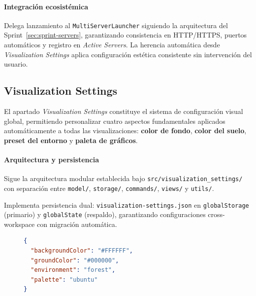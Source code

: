\documentclass[a4paper, 12pt]{book}
\begin{document}
\paragraph{Integración ecosistémica}
Delega lanzamiento al \texttt{MultiServerLauncher} siguiendo la arquitectura del Sprint~\ref{sec:sprint-servers}, garantizando consistencia en HTTP/HTTPS, puertos automáticos y registro en \emph{Active Servers}. La herencia automática desde \emph{Visualization Settings} aplica configuración estética consistente sin intervención del usuario.



\subsection{Visualization Settings}
\label{sec:visualization-settings}

El apartado \emph{Visualization Settings} constituye el sistema de configuración visual global, permitiendo personalizar cuatro aspectos fundamentales aplicados automáticamente a todas las visualizaciones: \textbf{color de fondo}, \textbf{color del suelo}, \textbf{preset del entorno} y \textbf{paleta de gráficos}.

\paragraph{Arquitectura y persistencia}
Sigue la arquitectura modular establecida bajo \texttt{src/visualization\_settings/} con separación entre \texttt{model/}, \texttt{storage/}, \texttt{commands/}, \texttt{views/} y \texttt{utils/}. 

Implementa persistencia dual: \texttt{visualization-settings.json} en \texttt{globalStorage} (primario) y \texttt{globalState} (respaldo), garantizando configuraciones cross-workspace con migración automática.

\begin{figure}[H]
\centering
\begin{minipage}{0.9\linewidth}
\begin{lstlisting}[language=json,
caption={Estructura del archivo \texttt{visualization-settings.json} que persiste las preferencias visuales globales.},
label={fig:visualization-settings-json}]
{
  "backgroundColor": "#FFFFFF",
  "groundColor": "#000000",
  "environment": "forest", 
  "palette": "ubuntu"
}
\end{lstlisting}
\end{minipage}
\end{figure}
\end{document}
